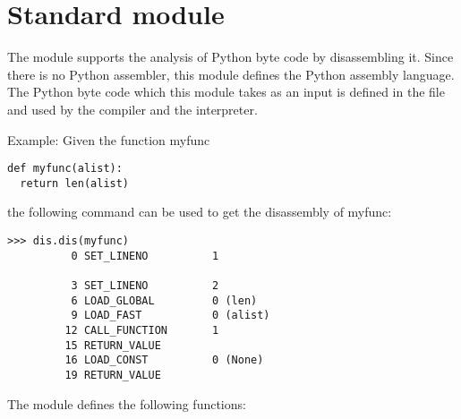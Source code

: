 \section{Standard module }	%

\label{module-dis}

The  module supports the analysis of Python byte code by
disassembling it.  Since there is no Python assembler, this module
defines the Python assembly language.  The Python byte code which
this module takes as an input is defined in the file 
 and used by the compiler and the interpreter.

Example: Given the function myfunc

\bcode\begin{verbatim}
def myfunc(alist):
  return len(alist)
\end{verbatim}\ecode

the following command can be used to get the disassembly of myfunc:

\begin{verbatim}
>>> dis.dis(myfunc)
          0 SET_LINENO          1

          3 SET_LINENO          2
          6 LOAD_GLOBAL         0 (len)
          9 LOAD_FAST           0 (alist)
         12 CALL_FUNCTION       1
         15 RETURN_VALUE   
         16 LOAD_CONST          0 (None)
         19 RETURN_VALUE   
\end{verbatim}

The  module defines the following functions:

\renewcommand{\indexsubitem}{(in module dis)}


